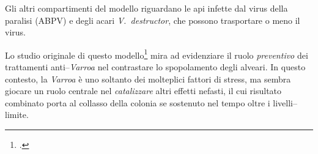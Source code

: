 Gli altri compartimenti del modello riguardano le api infette dal virus della paralisi (ABPV) e degli acari
\emph{V.~destructor}, che possono trasportare o meno il virus.

Lo studio originale di questo modello\footcite{ratti2017}  mira ad evidenziare il ruolo \emph{preventivo}
dei trattamenti anti--\emph{Varroa} nel contrastare lo spopolamento degli alveari.
In questo contesto, la \emph{Varroa} è uno soltanto dei molteplici fattori di stress, ma sembra giocare
un ruolo centrale nel \emph{catalizzare} altri effetti nefasti, il cui risultato combinato porta al collasso
della colonia se sostenuto nel tempo oltre i livelli--limite.





